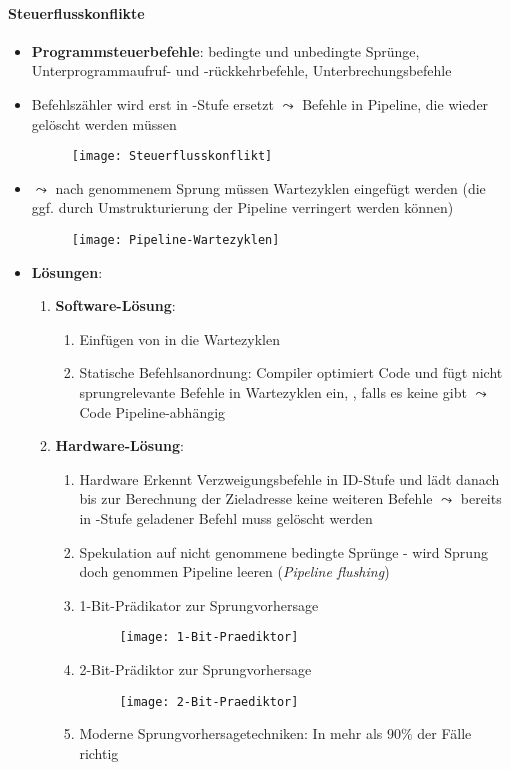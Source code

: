 \paragraph{Steuerflusskonflikte}
\begin{itemize}
  \item \textbf{Programmsteuerbefehle}: bedingte und unbedingte Sprünge, Unterprogrammaufruf- und -rückkehrbefehle, Unterbrechungsbefehle
  \item Befehlszähler wird erst in -Stufe ersetzt \( \leadsto \) Befehle in Pipeline, die wieder gelöscht werden müssen
  \begin{figure}[H]\centering\label{Steuerflusskonflikt}\texttt{[image: Steuerflusskonflikt]}\end{figure}
  \item \( \leadsto \) nach genommenem Sprung müssen Wartezyklen eingefügt werden (die ggf. durch Umstrukturierung der Pipeline verringert werden können)
  \begin{figure}[H]\centering\label{Pipeline-Wartezyklen}\texttt{[image: Pipeline-Wartezyklen]}\end{figure}

  \item \textbf{Lösungen}:
  \begin{enumerate}
    \item \textbf{Software-Lösung}:
    \begin{enumerate}
      \item Einfügen von  in die Wartezyklen
      \item Statische Befehlsanordnung: Compiler optimiert Code und fügt nicht sprungrelevante Befehle in Wartezyklen ein, , falls es keine gibt \( \leadsto \) Code Pipeline-abhängig
    \end{enumerate}
    \item \textbf{Hardware-Lösung}:
    \begin{enumerate}
      \item Hardware Erkennt Verzweigungsbefehle in ID-Stufe und lädt danach bis zur Berechnung der Zieladresse keine weiteren Befehle \( \leadsto \) bereits in -Stufe geladener Befehl muss gelöscht werden
      \item Spekulation auf nicht genommene bedingte Sprünge - wird Sprung doch genommen Pipeline leeren (\emph{Pipeline flushing})
      \item 1-Bit-Prädikator zur Sprungvorhersage
      \begin{figure}[H]\centering\label{1-Bit-Praediktor}\texttt{[image: 1-Bit-Praediktor]}\end{figure}
      \item 2-Bit-Prädiktor zur Sprungvorhersage
      \begin{figure}[H]\centering\label{2-Bit-Praediktor}\texttt{[image: 2-Bit-Praediktor]}\end{figure}
      \item Moderne Sprungvorhersagetechniken: In mehr als \( 90\% \) der Fälle richtig
    \end{enumerate}
  \end{enumerate}
\end{itemize}